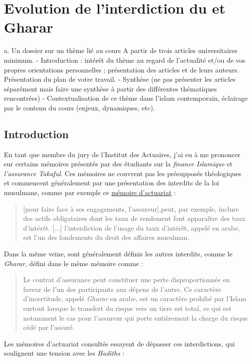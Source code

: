\chapter{Evolution de l'interdiction du \riba et Gharar}


a. Un dossier sur un thème lié au cours A partir de trois articles universitaires minimum. -  Introduction : intérêt du thème au regard de l’actualité et/ou de vos propres orientations personnelles ; présentation des articles et de leurs auteurs. Présentation du plan de votre travail. - Synthèse (ne pas présenter les articles séparément mais faire une synthèse à partir des différentes thématiques rencontrées) - Contextualisation de ce thème dans l’islam contemporain, éclairage par le contenu du cours (enjeux, dynamiques, etc). 

\section{Introduction}

En tant que membre du jury de l'Institut des Actuaires, j'ai eu à me prononcer sur certains mémoires présentés par des étudiants sur la \textit{finance Islamique} et \textit{l'assurance Takaful}. Ces mémoires ne couvrent pas les présupposés théologiques et commencent généralement par une présentation des interdits de la loi musulmane, comme par exemple ce \href{http://www.ressources-actuarielles.net/EXT/ISFA/1226-02.nsf/0/8c814ff5f2bae57ec1257e1a004407b6/\%24FILE/Memoire_ISFA_Tontines_et_Takaful_Bendimerad_Version_avec_Couverture.pdf}{mémoire d'actuariat} : 
\begin{quote}
     [pour faire face à ses  engagements, l'assureur],peut, par exemple, inclure des actifs obligataires dont les taux de rendement font apparaître des taux d'intérêt. [...] l'interdiction de l'usage du taux d'intérêt, appelé \textit{\riba} en arabe, est l'un des fondements du droit des affaires musulman.
\end{quote}
Dans la même veine, sont généralement définis les autres interdits, comme le \emph{Gharar}, défini dans le même mémoire comme : 
\begin{quote}
    Le contrat d'assurance peut constituer une perte disproportionnée en faveur de l'un des participants aux dépens de l'autre. Ce caractère d'incertitude, appelé \textit{Gharar} en arabe, est un caractère prohibé par l'Islam surtout lorsque le transfert du risque vers un tiers est total, ce qui est notamment le cas pour l'assureur qui porte entièrement la charge du risque cédé par l'assuré.
\end{quote}
Les mémoires d'actuariat consultés essayent de dépasser ces interdictions, qui soulignent une tension avec les \textit{Hadiths} : 


